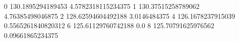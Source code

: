0 130.1895294189453 4.5782318115234375
1 130.37515258789062 4.76385498046875
2 128.62594604492188 3.0146484375
4 126.1678237915039 0.5565261840820312
6 125.61129760742188 0.0
8 125.70791625976562 0.09661865234375
